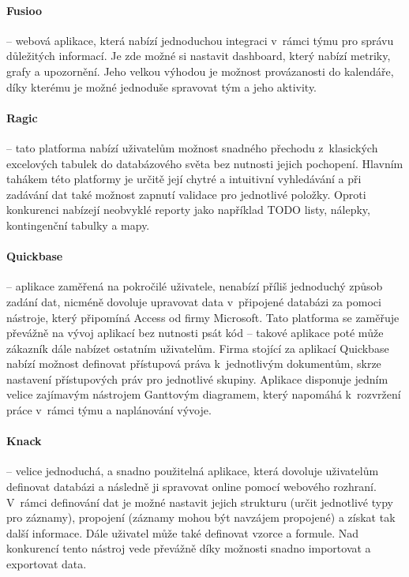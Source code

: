 \paragraph{Fusioo} -- webová aplikace, která nabízí jednoduchou integraci v~rámci týmu pro správu důležitých informací. Je zde možné si nastavit dashboard, který nabízí metriky, grafy a upozornění. Jeho velkou výhodou je možnost provázanosti do kalendáře, díky kterému je možné jednoduše spravovat tým a jeho aktivity.

\paragraph{Ragic} -- tato platforma nabízí uživatelům možnost snadného přechodu z~klasických excelových tabulek do databázového světa bez nutnosti jejich pochopení. Hlavním tahákem této platformy je určitě její chytré a intuitivní vyhledávání a při zadávání dat také možnost zapnutí validace pro jednotlivé položky. Oproti konkurenci nabízejí neobvyklé reporty jako například TODO listy, nálepky, kontingenční tabulky a mapy.

\paragraph{Quickbase} -- aplikace zaměřená na pokročilé uživatele, nenabízí příliš jednoduchý způsob zadání dat, nicméně dovoluje upravovat data v~připojené databázi za pomoci nástroje, který připomíná Access od firmy Microsoft. Tato platforma se zaměřuje převážně na vývoj aplikací bez nutnosti psát kód -- takové aplikace poté může zákazník dále nabízet ostatním uživatelům. Firma stojící za aplikací Quickbase nabízí možnost definovat přístupová práva k~jednotlivým dokumentům, skrze nastavení přístupových práv pro jednotlivé skupiny. Aplikace disponuje jedním velice zajímavým nástrojem Ganttovým diagramem, který napomáhá k~rozvržení práce v~rámci týmu a naplánování vývoje.

\paragraph{Knack} -- velice jednoduchá, a snadno použitelná aplikace, která dovoluje uživatelům definovat databázi a následně ji spravovat online pomocí webového rozhraní. V~rámci definování dat je možné nastavit jejich strukturu (určit jednotlivé typy pro záznamy), propojení (záznamy mohou být navzájem propojené) a získat tak další informace. Dále uživatel může také definovat vzorce a formule. Nad konkurencí tento nástroj vede převážně díky možnosti snadno importovat a exportovat data.

